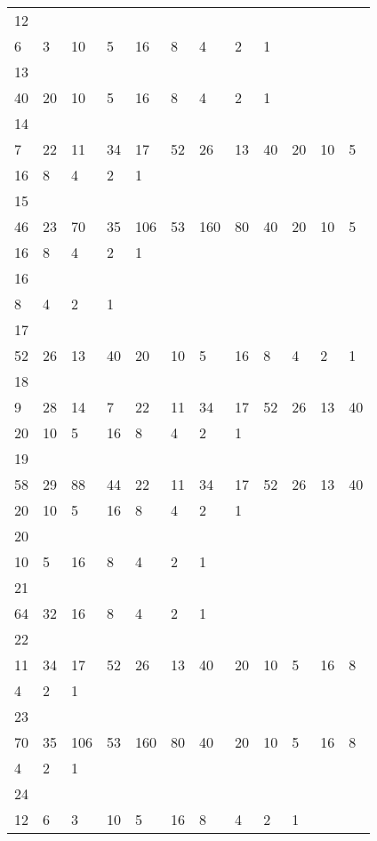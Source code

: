 \begin{longtable}{llllllllllll}
12&&&&&&&&&&&\\
6& 3& 10& 5& 16& 8& 4& 2& 1& \\

13&&&&&&&&&&&\\
40& 20& 10& 5& 16& 8& 4& 2& 1& \\

14&&&&&&&&&&&\\
7& 22& 11& 34& 17& 52& 26& 13& 40& 20& 10& 5\\
16& 8& 4& 2& 1& \\

15&&&&&&&&&&&\\
46& 23& 70& 35& 106& 53& 160& 80& 40& 20& 10& 5\\
16& 8& 4& 2& 1& \\

16&&&&&&&&&&&\\
8& 4& 2& 1& \\

17&&&&&&&&&&&\\
52& 26& 13& 40& 20& 10& 5& 16& 8& 4& 2& 1\\

18&&&&&&&&&&&\\
9& 28& 14& 7& 22& 11& 34& 17& 52& 26& 13& 40\\
20& 10& 5& 16& 8& 4& 2& 1& \\

19&&&&&&&&&&&\\
58& 29& 88& 44& 22& 11& 34& 17& 52& 26& 13& 40\\
20& 10& 5& 16& 8& 4& 2& 1& \\

20&&&&&&&&&&&\\
10& 5& 16& 8& 4& 2& 1& \\

21&&&&&&&&&&&\\
64& 32& 16& 8& 4& 2& 1& \\

22&&&&&&&&&&&\\
11& 34& 17& 52& 26& 13& 40& 20& 10& 5& 16& 8\\
4& 2& 1& \\

23&&&&&&&&&&&\\
70& 35& 106& 53& 160& 80& 40& 20& 10& 5& 16& 8\\
4& 2& 1& \\

24&&&&&&&&&&&\\
12& 6& 3& 10& 5& 16& 8& 4& 2& 1& \\


\end{longtable}

